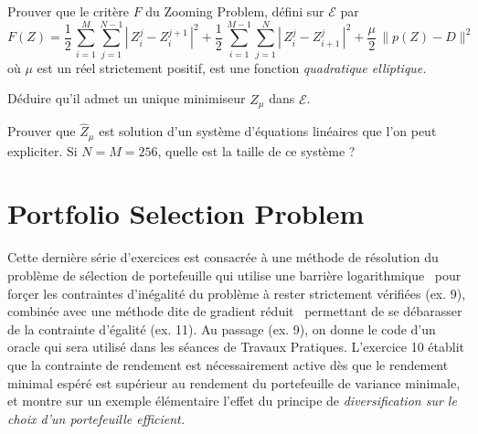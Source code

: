 \documentclass[12pt,a4paper,fleqn]{report}
\newcommand{\on}{\begin{displaymath}}
\newcommand{\off}{\end{displaymath}}
\begin{document}
\begin{exercice}
\rien
\begin{questions}
\item Prouver que le crit\`ere $F$ du \og Zooming Problem\fg, d\'efini sur $\mathcal E$ par
\on F(Z)= \frac{1}{2}\, \sum_{i=1}^M \sum_{j=1}^{N-1} \left| \, Z_i^j -Z_i^{j+1}\,\right|^2 +
\frac{1}{2}\,\sum_{i=1}^{M-1} \sum_{j=1}^N \left| \, Z_i^j -Z_{i+1}^j \,\right|^2 + \frac{\mu}{2}\,\| p(Z)-D\|^2 \off
o\`u $\mu$ est un r\'eel strictement positif, est une fonction \it quadratique elliptique\rm.
\item D\'eduire qu'il admet un unique minimiseur $\hat Z_\mu$ dans $\mathcal E$.
\item Prouver que $\hat Z_\mu$ est solution d'un syst\`eme d'\'equations lin\'eaires que l'on peut expliciter. Si $N=M=256$, quelle est la taille de ce syst\`eme ?
\end{questions}
\end{exercice}


\section{Portfolio Selection Problem}

Cette derni\`ere s\'erie d'exercices est consacr\'ee \`a une m\'ethode de r\'esolution du probl\`eme de s\'election de portefeuille qui utilise une \og barri\`ere logarithmique \fg\ pour forçer les contraintes d'in\'egalit\'e du probl\`eme \`a rester strictement v\'erifi\'ees (ex. 9), combin\'ee avec une m\'ethode dite de \og gradient r\'eduit \fg\ permettant de se d\'ebarasser de la contrainte d'\'egalit\'e (ex. 11). Au passage (ex. 9), on donne le code d'un oracle qui sera utilis\'e dans les s\'eances de Travaux Pratiques. L'exercice 10 \'etablit que la contrainte de rendement est n\'ecessairement active d\`es que le rendement minimal esp\'er\'e est sup\'erieur au rendement du portefeuille de variance minimale, et montre sur un exemple \'el\'ementaire l'effet du principe de \it diversification \rm sur le choix d'un portefeuille efficient.
\end{document}
